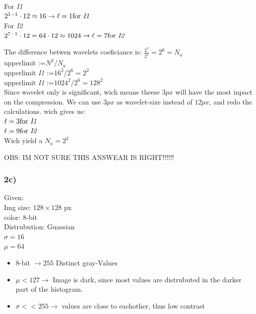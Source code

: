 \documentclass[12pt]{article}
\begin{document}
    For \textit{I1}\\
    $2^{1-1}\cdot 12 \approx 16 \rightarrow \ell = 1 \text{for \textit{I1}}$\\
    For \textit{I2}\\
    $2^{7-1}\cdot 12 = 64 \cdot 12 \approx 1024 \rightarrow \ell = 7 \text{for \textit{I2}}$
        
    The difference betwen wavelets coeficiance is: $\frac{2^7}{2^1} = 2^6 = N_a$\\
    
    upperlimit :=$ N^2/N_a $\\
    upperlimit \textit{I1} :=$ 16^2/ 2^6 = 2^2$\\
    upperlimit \textit{I1} :=$ 1024^2/ 2^6 = 128^2$\\
     
     
     Since wavelet only is significant, wich means theese $3px$ will have the most inpact on the compression. We can use $3px$ as wavelet-size instead of $12px$, and redo the calculations.
     wich gives us: \\
     $\ell = 3 \text{for \textit{I1}}$ \\
     $\ell = 9 \text{for \textit{I2}}$ \\
     
     Wich yield a $N_a=2^2$
     
     OBS: IM NOT SURE THIS ANSWEAR IS RIGHT!!!!!!
     
     \subsubsection*{2c)}
     Given:\\
     Img size: $128 \times 128$ px\\
     color: $8$-bit\\
     Distrubution: Guassian\\
     $\sigma= 16$\\
     $\mu= 64$\\
     
     \begin{itemize}
    \item 8-bit $\rightarrow 255$ Distinct gray-Values
    \item $\mu < 127 \rightarrow$ Image is dark, since most values are distrubuted in the darker part of the histogram. 
    \item $\sigma << 255 \rightarrow $ values are close to eachother, thus low contrast
    \end{itemize}
    
\end{document}
